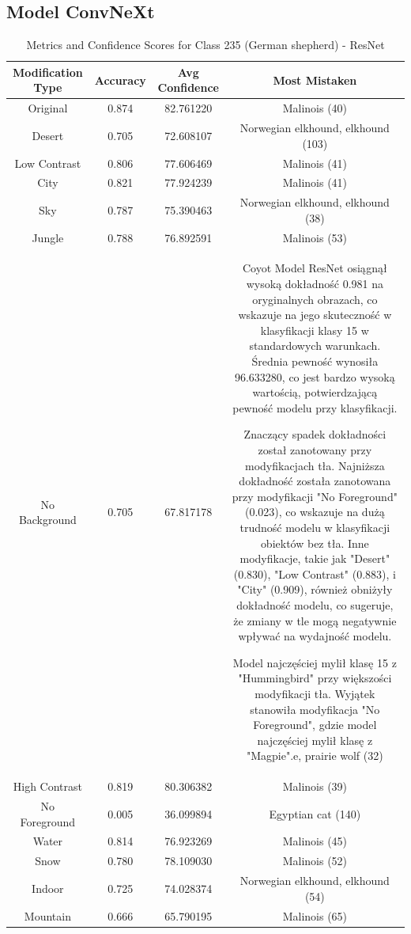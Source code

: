 \subsection*{Model ConvNeXt}


\begin{table}
	\centering
	\begin{tabular}{|c|c|c|c|}
		\hline
		\textbf{Modification Type} & \textbf{Accuracy} & \textbf{Avg Confidence} & \textbf{Most Mistaken} \\
		\hline
		Original & 0.874 & 82.761220 & Malinois (40) \\
		\hline
		Desert & 0.705 & 72.608107 & Norwegian elkhound, elkhound (103) \\
		\hline
		Low Contrast & 0.806 & 77.606469 & Malinois (41) \\
		\hline
		City & 0.821 & 77.924239 & Malinois (41) \\
		\hline
		Sky & 0.787 & 75.390463 & Norwegian elkhound, elkhound (38) \\
		\hline
		Jungle & 0.788 & 76.892591 & Malinois (53) \\
		\hline
		No Background & 0.705 & 67.817178 & Coyot
		Model ResNet osiągnął wysoką dokładność 0.981 na oryginalnych obrazach, co wskazuje na jego skuteczność w klasyfikacji klasy 15 w standardowych warunkach. Średnia pewność wynosiła 96.633280, co jest bardzo wysoką wartością, potwierdzającą pewność modelu przy klasyfikacji.
		
		Znaczący spadek dokładności został zanotowany przy modyfikacjach tła. Najniższa dokładność została zanotowana przy modyfikacji "No Foreground" (0.023), co wskazuje na dużą trudność modelu w klasyfikacji obiektów bez tła. Inne modyfikacje, takie jak "Desert" (0.830), "Low Contrast" (0.883), i "City" (0.909), również obniżyły dokładność modelu, co sugeruje, że zmiany w tle mogą negatywnie wpływać na wydajność modelu.
		
		Model najczęściej mylił klasę 15 z "Hummingbird" przy większości modyfikacji tła. Wyjątek stanowiła modyfikacja "No Foreground", gdzie model najczęściej mylił klasę z "Magpie".e, prairie wolf (32) \\
		\hline
		High Contrast & 0.819 & 80.306382 & Malinois (39) \\
		\hline
		No Foreground & 0.005 & 36.099894 & Egyptian cat (140) \\
		\hline
		Water & 0.814 & 76.923269 & Malinois (45) \\
		\hline
		Snow & 0.780 & 78.109030 & Malinois (52) \\
		\hline
		Indoor & 0.725 & 74.028374 & Norwegian elkhound, elkhound (54) \\
		\hline
		Mountain & 0.666 & 65.790195 & Malinois (65) \\
		\hline
	\end{tabular}
	\caption{Metrics and Confidence Scores for Class 235 (German shepherd) - ResNet}
	\label{tab:metrics_confidence_class_235_resnet}
\end{table}

